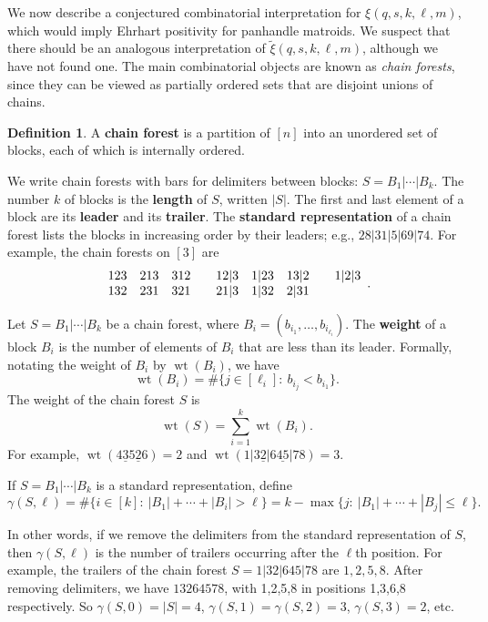 \documentclass[11pt]{amsart}
\theoremstyle{definition}
\newtheorem{definition}[theorem]{Definition}
\newcommand{\0}{\emptyset}
\newcommand{\defterm}[1]{\textbf{#1}}
\DeclareMathOperator{\wt}{wt}
\begin{document}
We now describe a conjectured combinatorial interpretation for $\xi(q,s,k,\ell,m)$, which would imply Ehrhart positivity for panhandle matroids.
We suspect that there should be an analogous interpretation of $\tilde\xi(q,s,k,\ell,m)$, although we have not found one.
The main combinatorial objects are known as \textit{chain forests}, since they can be viewed as partially ordered sets that are disjoint unions of chains.

\begin{definition}
A \defterm{chain forest} is a partition of $[n]$ into an unordered set of blocks, each of which is internally ordered.
\end{definition}

We write chain forests with bars for delimiters between blocks: $S=B_1|\cdots|B_k$.
The number $k$ of blocks is the \defterm{length} of $S$, written $|S|$.
The first and last element of a block are its \defterm{leader} and its \defterm{trailer}.
The \defterm{standard representation} of a chain forest lists the blocks in increasing order by their leaders; e.g., $28|31|5|69|74$.
For example, the chain forests on $[3]$ are
\[\begin{array}{lll l lll l l}
123 & 213 & 312 && 12|3 & 1|23 & 13|2 && 1|2|3\\
132 & 231 & 321 && 21|3 & 1|32 & 2|31
\end{array}.\]

Let $S=B_1|\cdots|B_k$ be a chain forest, where $B_i=(b_{i_1},\dots,b_{i_{\ell_i}})$.
The \defterm{weight} of a block $B_i$ is the number of elements of $B_i$ that are less than its leader. 
Formally, notating the weight of $B_i$ by $\wt(B_i)$, we have
\[\wt(B_i) =  \#\{j\in[\ell_i]:\ b_{i_j}<b_{i_1}\}.\]
The weight of the chain forest $S$ is
\[
\wt(S)=\sum_{i=1}^k\wt(B_i).
\]
For example, $\wt(4\underline{3}5\underline{2}6)=2$ and $\wt(1|3\underline{2}|6\underline{45}|78)=3$.

If $S=B_1|\cdots|B_k$ is a standard representation, define
\[\gamma(S,\ell)=\#\{i\in[k]:\ |B_1|+\cdots+|B_i|>\ell\}=k-\max\{j:\ |B_1|+\cdots+|B_j|\leq\ell\}.\]

In other words, if we remove the delimiters from the standard representation of $S$, then $\gamma(S,\ell)$ is the number of trailers occurring after the $\ell$th position.
For example, the trailers of the chain forest $S=1|32|645|78$ are $1,2,5,8$.
After removing delimiters, we have $13264578$, with 1,2,5,8 in positions 1,3,6,8 respectively.  
So $\gamma(S,0)=|S|=4$, $\gamma(S,1)=\gamma(S,2)=3$, $\gamma(S,3)=2$, etc.
\end{document}
